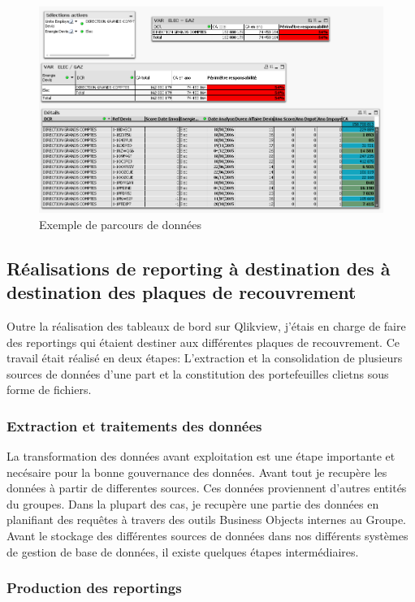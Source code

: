 \documentclass[11pt,a4paper]{article}
\begin{document}
\begin{figure}[h]
 \centering
 \includegraphics[scale=0.5]{exemple_qlikView.PNG}
 \caption{Exemple de parcours de données}
 \label{qlikview_qlik}
 
\end{figure}
\subsection{Réalisations de reporting à destination des à destination des plaques de recouvrement}
Outre la réalisation des tableaux de bord sur Qlikview, j'étais en charge de faire des reportings qui étaient destiner aux différentes plaques de recouvrement. Ce travail était réalisé en deux étapes: L'extraction et la consolidation de plusieurs sources de données d'une part et la constitution des portefeuilles clietns sous forme de fichiers.   

\subsubsection{Extraction et traitements des données}
La transformation des données avant exploitation est une étape importante et necésaire pour la bonne gouvernance des données. 
Avant tout je recupère les données à partir de differentes sources. Ces données proviennent d'autres entités du groupes. Dans la plupart des cas, je recupère une partie des données en planifiant des requêtes à travers des outils Business Objects internes au Groupe. Avant le stockage des différentes sources de données dans nos différents systèmes de gestion de base de données, il existe quelques étapes intermédiaires. 



\subsubsection{Production des reportings}
\end{document}
